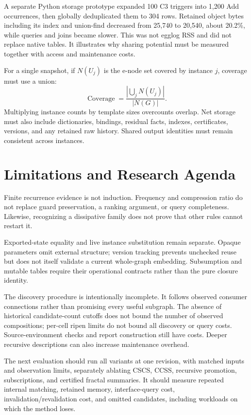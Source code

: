 \documentclass[11pt,a4paper]{article}
\begin{document}
A separate Python storage prototype expanded 100 C3 triggers into 1,200 Add
occurrences, then globally deduplicated them to 304 rows. Retained object bytes
including its index and union-find decreased from 25,740 to 20,540, about 20.2\%,
while queries and joins became slower. This was not egglog RSS and did not replace
native tables. It illustrates why sharing potential must be measured together
with access and maintenance costs.

For a single snapshot, if $N(U_j)$ is the e-node set covered by instance $j$,
coverage must use a union:
\begin{equation}
 \operatorname{Coverage}=\frac{|\bigcup_j N(U_j)|}{|N(G)|}.
\end{equation}
Multiplying instance counts by template sizes overcounts overlap. Net storage
must also include dictionaries, bindings, residual facts, indexes, certificates,
versions, and any retained raw history. Shared output identities must remain
consistent across instances.

\section{Limitations and Research Agenda}
Finite recurrence evidence is not induction. Frequency and compression ratio do
not replace guard preservation, a ranking argument, or query completeness.
Likewise, recognizing a dissipative family does not prove that other rules cannot
restart it.

Exported-state equality and live instance substitution remain separate. Opaque
parameters omit external structure; version tracking prevents unchecked reuse but
does not itself validate a current whole-graph embedding. Subsumption and mutable
tables require their operational contracts rather than the pure closure identity.

The discovery procedure is intentionally incomplete. It follows observed
consumer connections rather than promising every useful subgraph. The absence
of historical candidate-count cutoffs does not bound the number of observed
compositions; per-cell ripen limits do not bound all discovery or query costs.
Source-environment checks and report construction still have costs. Deeper
recursive descriptions can also increase maintenance overhead.

The next evaluation should run all variants at one revision, with matched inputs
and observation limits, separately ablating CSCS, CCSS, recursive promotion,
subscriptions, and certified fractal summaries. It should measure repeated
internal matching, retained memory, interface-query cost, invalidation/revalidation
cost, and omitted candidates, including workloads on which the method loses.
\end{document}
